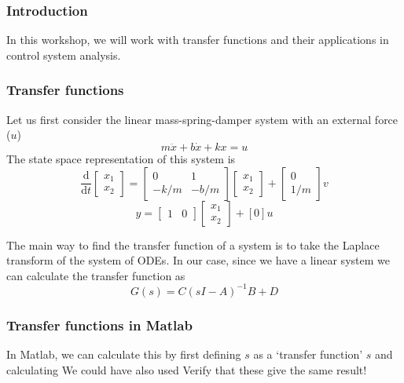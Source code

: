 \documentclass[9pt]{beamer-control}
\begin{document}

\begin{frame}
\frametitle{Introduction}
In this workshop, we will work with transfer functions and their applications in control system analysis.
\end{frame}


\begin{frame}[fragile]
\frametitle{Transfer functions}
Let us first consider the linear mass-spring-damper system with an external force ($u$)
\begin{equation}m\ddot{x}+b\dot{x}+kx=u\end{equation}
The state space representation of this system is 
\begin{equation}\frac{\mathrm{d}}{\mathrm{d}t}\begin{bmatrix}
	x_1 \\ x_2
\end{bmatrix} = \begin{bmatrix}
	0 & 1 \\ -k/m & -b/m
\end{bmatrix} \begin{bmatrix}
	x_1 \\ x_2
\end{bmatrix}  + \begin{bmatrix}
	0 \\ 1/m
\end{bmatrix} v\end{equation}
\begin{equation}y=\begin{bmatrix}
	1 & 0
\end{bmatrix}  \begin{bmatrix}
	x_1 \\ x_2
\end{bmatrix} + [0] u\end{equation}

The main way to find the transfer function of a system is to take the Laplace transform of the system of ODEs. In our case, since we have a linear system we can calculate the transfer function as 
\begin{equation}G(s) = C(sI-A)^{-1}B+D\end{equation}
\end{frame}


\begin{frame}
	\frametitle{Transfer functions in Matlab}
In Matlab, we can calculate this by first defining $s$ as a `transfer function' $s$ and calculating
We could have also used
Verify that these give the same result!
\end{frame}
\end{document}
